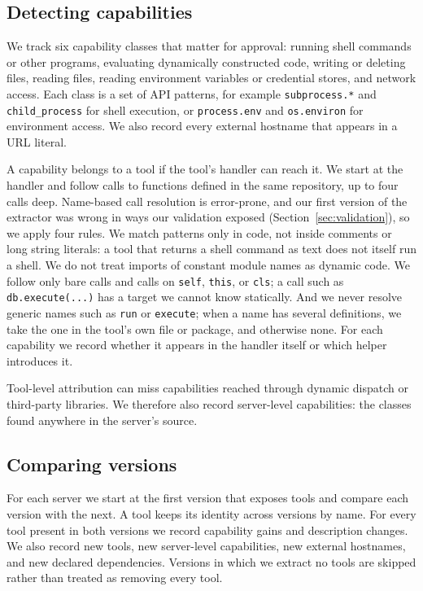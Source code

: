 \subsection{Detecting capabilities}\label{sec:caps}
We track six capability classes that matter for approval: running shell commands or other programs, evaluating dynamically constructed code, writing or deleting files, reading files, reading environment variables or credential stores, and network access. Each class is a set of API patterns, for example \texttt{subprocess.*} and \texttt{child\_process} for shell execution, or \texttt{process.env} and \texttt{os.environ} for environment access. We also record every external hostname that appears in a URL literal.

A capability belongs to a tool if the tool's handler can reach it. We start at the handler and follow calls to functions defined in the same repository, up to four calls deep. Name-based call resolution is error-prone, and our first version of the extractor was wrong in ways our validation exposed (Section~\ref{sec:validation}), so we apply four rules. We match patterns only in code, not inside comments or long string literals: a tool that returns a shell command as text does not itself run a shell. We do not treat imports of constant module names as dynamic code. We follow only bare calls and calls on \texttt{self}, \texttt{this}, or \texttt{cls}; a call such as \texttt{db.execute(...)} has a target we cannot know statically. And we never resolve generic names such as \texttt{run} or \texttt{execute}; when a name has several definitions, we take the one in the tool's own file or package, and otherwise none. For each capability we record whether it appears in the handler itself or which helper introduces it.

Tool-level attribution can miss capabilities reached through dynamic dispatch or third-party libraries. We therefore also record server-level capabilities: the classes found anywhere in the server's source.

\subsection{Comparing versions}\label{sec:diff}
For each server we start at the first version that exposes tools and compare each version with the next. A tool keeps its identity across versions by name. For every tool present in both versions we record capability gains and description changes. We also record new tools, new server-level capabilities, new external hostnames, and new declared dependencies. Versions in which we extract no tools are skipped rather than treated as removing every tool.

